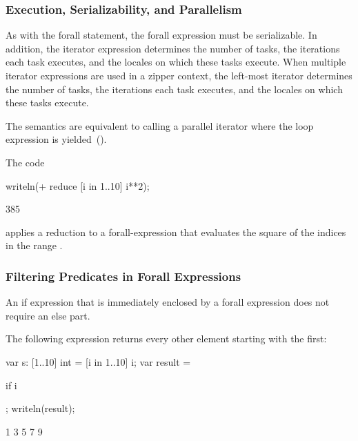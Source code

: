 \subsubsection{Execution, Serializability, and Parallelism}

As with the forall statement, the forall expression must be
serializable.  In addition, the iterator expression determines the
number of tasks, the iterations each task executes, and the locales on
which these tasks execute.  When multiple iterator expressions are
used in a zipper context, the left-most iterator determines the number
of tasks, the iterations each task executes, and the locales on which
these tasks execute.

The semantics are equivalent to calling a parallel iterator where the
loop expression is yielded~().

\begin{example}
The code
\begin{chapelpre}
\end{chapelpre}
\begin{chapel}
writeln(+ reduce [i in 1..10] i**2);
\end{chapel}
\begin{chapeloutput}
385
\end{chapeloutput}
applies a reduction to a forall-expression that evaluates the square
of the indices in the range .
\end{example}

\subsubsection{Filtering Predicates in Forall Expressions}
\label{Filtering_Predicates_Forall}

An if expression that is immediately enclosed by a forall expression
does not require an else part.
\begin{example}
The following expression returns every other element starting with the
first:
\begin{chapelpre}
var s: [1..10] int = [i in 1..10] i;
var result =
\end{chapelpre}
\begin{chapel}
[i in 1..s.numElements] if i %
\end{chapel}
\begin{chapelpost}
;
writeln(result);
\end{chapelpost}
\begin{chapeloutput}
1 3 5 7 9
\end{chapeloutput}
\end{example}

